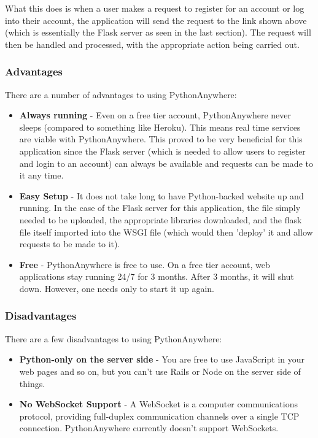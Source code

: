 What this does is when a user makes a request to register for an account or log into their account, the application will send the request to the link shown above (which is essentially the Flask server as seen in the last section). The request will then be handled and processed, with the appropriate action being carried out.

\newpage
\subsubsection{Advantages}
There are a number of advantages to using PythonAnywhere:

\begin{itemize}
    \item \textbf{Always running} - Even on a free tier account, PythonAnywhere
    never sleeps (compared to something like Heroku). This means real time 
    services are viable with PythonAnywhere. This proved to be very beneficial for this application since the Flask server (which is needed to allow users to register and login to an account) can always be available and requests can be made to it any time.
    \item \textbf{Easy Setup} - It does not take long to have Python-backed website up and running. In the case of the Flask server for this application, the file simply needed to be uploaded, the appropriate libraries downloaded, and the flask file itself imported into the WSGI file (which would then 'deploy' it and allow requests to be made to it).
    \item \textbf{Free} - PythonAnywhere is free to use. On a free tier account,
    web applications stay running 24/7 for 3 months. After 3 months, it will
    shut down. However, one needs only to start it up again.
\end{itemize}

\subsubsection{Disadvantages}
There are a few disadvantages to using PythonAnywhere:

\begin{itemize}
    \item \textbf{Python-only on the server side} - You are free to use
    JavaScript in your web pages and so on, but you can't use Rails or Node on 
    the server side of things.
    \item \textbf{No WebSocket Support} - A WebSocket is a computer communications protocol, providing full-duplex communication channels over a single TCP connection. PythonAnywhere currently doesn't support WebSockets.
\end{itemize}

